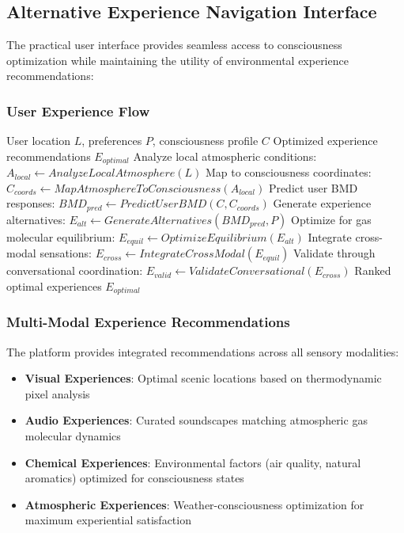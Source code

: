 \documentclass[12pt,a4paper]{article}
\begin{document}
\subsection{Alternative Experience Navigation Interface}

The practical user interface provides seamless access to consciousness optimization while maintaining the utility of environmental experience recommendations:

\subsubsection{User Experience Flow}

\begin{algorithm}[H]
\caption{User Experience Optimization Flow}
\begin{algorithmic}[1]
\REQUIRE User location $L$, preferences $P$, consciousness profile $C$
\ENSURE Optimized experience recommendations $E_{optimal}$
\STATE Analyze local atmospheric conditions: $A_{local} \leftarrow AnalyzeLocalAtmosphere(L)$
\STATE Map to consciousness coordinates: $C_{coords} \leftarrow MapAtmosphereToConsciousness(A_{local})$
\STATE Predict user BMD responses: $BMD_{pred} \leftarrow PredictUserBMD(C, C_{coords})$
\STATE Generate experience alternatives: $E_{alt} \leftarrow GenerateAlternatives(BMD_{pred}, P)$
\STATE Optimize for gas molecular equilibrium: $E_{equil} \leftarrow OptimizeEquilibrium(E_{alt})$
\STATE Integrate cross-modal sensations: $E_{cross} \leftarrow IntegrateCrossModal(E_{equil})$
\STATE Validate through conversational coordination: $E_{valid} \leftarrow ValidateConversational(E_{cross})$
\RETURN Ranked optimal experiences $E_{optimal}$
\end{algorithmic}
\end{algorithm}

\subsubsection{Multi-Modal Experience Recommendations}

The platform provides integrated recommendations across all sensory modalities:

\begin{itemize}
\item \textbf{Visual Experiences}: Optimal scenic locations based on thermodynamic pixel analysis
\item \textbf{Audio Experiences}: Curated soundscapes matching atmospheric gas molecular dynamics  
\item \textbf{Chemical Experiences}: Environmental factors (air quality, natural aromatics) optimized for consciousness states
\item \textbf{Atmospheric Experiences}: Weather-consciousness optimization for maximum experiential satisfaction
\end{itemize}
\end{document}
